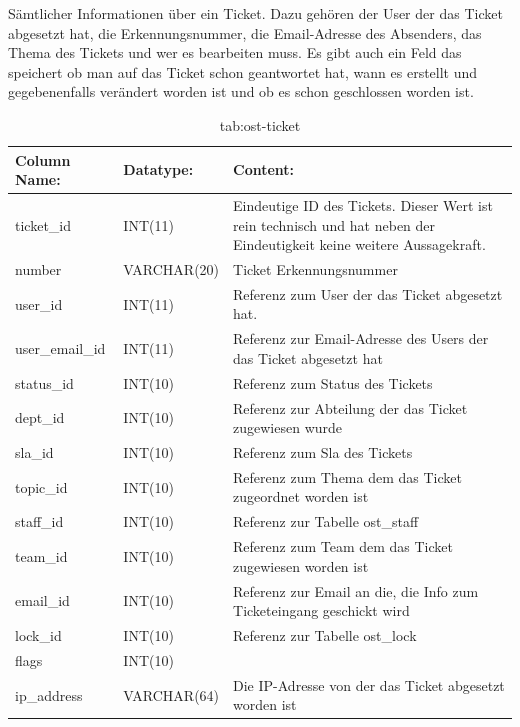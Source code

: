 Sämtlicher Informationen über ein Ticket. Dazu gehören der User der das Ticket abgesetzt hat, die Erkennungsnummer, die Email-Adresse des Absenders, das Thema des Tickets und wer es bearbeiten muss. Es gibt auch ein Feld das speichert ob man auf das Ticket schon geantwortet hat, wann es erstellt und gegebenenfalls verändert worden ist und ob es schon geschlossen worden ist.


\begin{table}[h]
	\begin{tabular}{|p{3.5cm}|p{4cm}|p{6.2cm}|}
		\hline
		\textbf{Column Name:} & \textbf{Datatype:} & \textbf{Content:}\\
		\hline
		ticket\_id & INT(11) & Eindeutige ID des Tickets. Dieser Wert ist rein technisch und hat  neben der Eindeutigkeit keine weitere 
		Aussagekraft.\\
		\hline
		number & VARCHAR(20) & Ticket Erkennungsnummer \\
		\hline
		user\_id & INT(11) & Referenz zum User der das Ticket abgesetzt hat.\\
		\hline
		user\_email\_id & INT(11) & Referenz zur Email-Adresse des Users der das Ticket abgesetzt hat\\
		\hline
		status\_id & INT(10) & Referenz zum Status des Tickets\\
		\hline
		dept\_id & INT(10) &  Referenz zur Abteilung der das Ticket zugewiesen wurde\\
		\hline
		sla\_id & INT(10) & Referenz zum Sla des Tickets\\
		\hline
		topic\_id & INT(10) & Referenz zum Thema dem das Ticket zugeordnet worden ist\\
		\hline
		staff\_id & INT(10) & Referenz zur Tabelle ost\_staff \\
		\hline
		team\_id & INT(10) & Referenz zum Team dem das Ticket zugewiesen worden ist \\
		\hline
		email\_id & INT(10) & Referenz zur Email an die, die Info zum Ticketeingang geschickt wird \\
		\hline
		lock\_id & INT(10) & Referenz zur Tabelle ost\_lock \\
		\hline
		flags & INT(10) &  \\
		\hline
		ip\_address & VARCHAR(64) & Die IP-Adresse von der das Ticket abgesetzt worden ist \\
		\hline
			\end{tabular}
			\caption{tab:ost-ticket}
		\end{table}
		\label{tab:ost_ticket}
		\newpage
